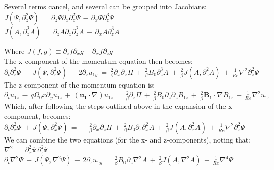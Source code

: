 \documentclass[letterpaper,12pt]{article}
\newcommand\reye{\mathrel{Re}}
\begin{document}
Several terms cancel, and several can be grouped into Jacobians: \\

$J\left(\Psi, \partial_z^2\Psi\right) \, = \, \partial_z \Psi \partial_x\partial_z^2\Psi \, - \, \partial_x\Psi\partial_z^3\Psi $ \\

$J\left(A, \partial_z^2 A\right) \, = \, \partial_z A \partial_x\partial_z^2A \, - \, \partial_xA\partial_z^3A $

Where $J\left(f, g\right) \equiv \partial_z f \partial_x g - \partial_x f \partial_z g$ \\ 

The x-component of the momentum equation then becomes: \\

$\partial_t\partial_z^2\Psi \, + \, J\left(\Psi, \partial_z^2\Psi\right) \, - \, 2\partial_z u_{1y} \, = \, \frac{2}{\beta}\partial_x\partial_z\Pi \, + \, \frac{2}{\beta}B_0 \partial_z^3A \, + \, \frac{2}{\beta}J\left(A, \partial_z^2A\right) \, + \, \frac{1}{\reye}\nabla^2 \partial_z^2 \Psi$ \\

The z-component of the momentum equation is: \\

$\partial_t u_{1z} \, - \, q\Omega_0x\partial_y u_{1z} \, + \, \left(\mathbf{u_1} \cdot \nabla \right) u_{1z} \, = \, \frac{2}{\beta}\partial_z \Pi \, + \, \frac{2}{\beta} B_0 \partial_z\partial_zB_{1z} \, + \, \frac{2}{\beta}\mathbf{B_1}\cdot\nabla B_{1z} \, + \, \frac{1}{\reye}\nabla^2 u_{1z} $ \\

Which, after following the steps outlined above in the expansion of the x-component, becomes: \\

$\partial_t \partial_x^2 \Psi \, + \, J\left(\Psi, \partial_x^2 \Psi\right) \, = \, -\frac{2}{\beta}\partial_x\partial_z\Pi \, + \, \frac{2}{\beta}B_0\partial_z\partial_x^2 A \, + \, \frac{2}{\beta}J\left(A, \partial_x^2 A \right) \, + \, \frac{1}{\reye} \nabla^2 \partial_x^2 \Psi$ \\

We can combine the two equations (for the x- and z-components), noting that: \\

$\nabla^2 \, = \, \partial_x^2 \mathbf{\hat{x}} \, \partial_z^2 \mathbf{\hat{z}}$ \\

$\partial_t \nabla^2 \Psi \, + \, J\left(\Psi, \nabla^2 \Psi\right) \, - \, 2 \partial_z u_{1y} \, = \, \frac{2}{\beta} B_0 \partial_z \nabla^2 A \, + \, \frac{2}{\beta}J\left(A, \nabla^2 A \right) \, + \, \frac{1}{\reye}\nabla^4 \Psi$ \\
\end{document}

